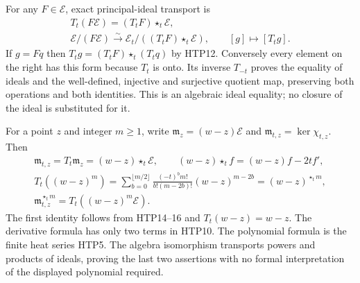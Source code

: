 For any $F\in\mathcal E$, exact principal-ideal transport is
\begin{equation}\tag{HTP16}
\begin{gathered}
 T_t(F\mathcal E)=(T_tF)\star_t\mathcal E,\\
 \mathcal E/(F\mathcal E)\overset{\sim}{\longrightarrow}
 \mathcal E_t/((T_tF)\star_t\mathcal E),\qquad
 [g]\longmapsto[T_tg].
\end{gathered}
\end{equation}
If $g=Fq$ then $T_tg=(T_tF)\star_t(T_tq)$ by HTP12.
Conversely every element on the right has this form because
$T_t$ is onto. Its inverse $T_{-t}$ proves the equality of
ideals and the well-defined, injective and surjective quotient
map, preserving both operations and both identities.
This is an algebraic ideal equality; no closure of the ideal
is substituted for it.

For a point $z$ and integer $m\ge1$, write
$\mathfrak m_z=(w-z)\mathcal E$ and
$\mathfrak m_{t,z}=\ker\chi_{t,z}$. Then
\begin{equation}\tag{HTP17}
\begin{gathered}
 \mathfrak m_{t,z}=T_t\mathfrak m_z=(w-z)\star_t\mathcal E,
 \qquad (w-z)\star_tf=(w-z)f-2tf',\\
 T_t((w-z)^m)=
 \sum_{b=0}^{\lfloor m/2\rfloor}
       \frac{(-t)^bm!}{b!(m-2b)!}(w-z)^{m-2b}
       =(w-z)^{\star_t m},\\
 \mathfrak m_{t,z}^{\star_t m}
                 =T_t((w-z)^m\mathcal E).
\end{gathered}
\end{equation}
The first identity follows from HTP14--16 and $T_t(w-z)=w-z$.
The derivative formula has only two terms in HTP10.
The polynomial formula is the finite heat series HTP5.
The algebra isomorphism transports powers and products of
ideals, proving the last two assertions with no formal
interpretation of the displayed polynomial required.


